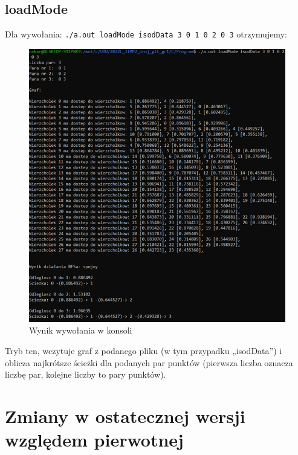 \documentclass{article}
\begin{document}
\subsection{loadMode}
Dla wywołania: \texttt{./a.out loadMode isodData 3 0 1 0 2 0 3} otrzymujemy:
 \begin{figure}[h]
\centering
\includegraphics[width=1\textwidth]{obraz1.png}
\caption{\label{fig:mod}Wynik wywołania w konsoli}
\end{figure}

Tryb ten, wczytuje graf z podanego pliku (w tym przypadku „isodData”) i oblicza najkrótsze ścieżki dla podanych par punktów (pierwsza liczba oznacza liczbę par, kolejne liczby to pary punktów).
\pagebreak










\section{Zmiany w ostatecznej wersji względem pierwotnej}
\end{document}
